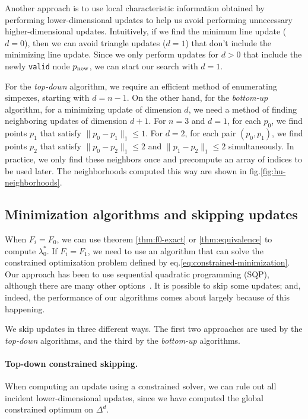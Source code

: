 \documentclass[smallcondensed]{svjour3}
\begin{document}
Another approach is to use local characteristic information obtained
by performing lower-dimensional updates to help us avoid performing
unnecessary higher-dimensional updates. Intuitively, if we find the
minimum line update ($d = 0$), then we can avoid triangle updates
($d = 1$) that don't include the minimizing line update. Since we only
perform updates for $d > 0$ that include the newly \texttt{valid} node
$p_{\operatorname{new}}$, we can start our search with $d = 1$.

For the \emph{top-down} algorithm, we require an efficient method of
enumerating simpexes, starting with $d = n - 1$. On the other hand,
for the \emph{bottom-up} algorithm, for a minimizing update of
dimension $d$, we need a method of finding neighboring updates of
dimension $d + 1$. For $n = 3$ and $d = 1$, for each $p_0$, we find
points $p_1$ that satisfy $\|p_0 - p_1\|_1 \leq 1$. For $d = 2$, for
each pair $(p_0, p_1)$, we find points $p_2$ that satisfy
$\|p_0 - p_2\|_1 \leq 2$ and $\|p_1 - p_2\|_1 \leq 2$
simultaneously. In practice, we only find these neighbors once and
precompute an array of indices to be used later. The neighborhoods
computed this way are shown in fig.\@ \ref{fig:hu-neighborhoods}.


\subsection{Minimization algorithms and skipping
  updates}\label{ssec:algorithms-and-skipping}

When $F_i = F_0$, we can use theorem \ref{thm:f0-exact} or
\ref{thm:equivalence} to compute $\lambda_0^*$. If $F_i = F_1$, we
need to use an algorithm that can solve the constrained optimization
problem defined by eq.\@ \ref{eq:constrained-minimization}. Our
approach has been to use sequential quadratic programming (SQP),
although there are many other
options~\cite{bertsekas1999nonlinear,nocedal2006numerical}. It is
possible to skip some updates; and, indeed, the performance of our
algorithms comes about largely because of this happening.

We skip updates in three different ways. The first two approaches are
used by the \emph{top-down} algorithms, and the third by the
\emph{bottom-up} algorithms.

\paragraph{Top-down constrained skipping.} When computing an update
using a constrained solver, we can rule out all incident
lower-dimensional updates, since we have computed the global
constrained optimum on $\Delta^d$.
\end{document}
